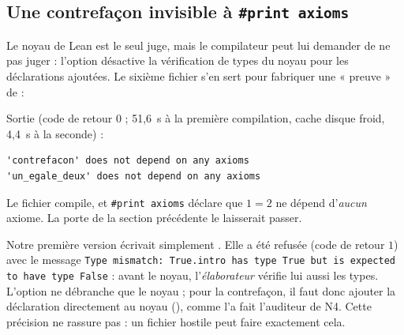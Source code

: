 \subsection{Une contrefaçon invisible à \texttt{\#print axioms}}
Le noyau de Lean est le seul juge, mais le compilateur peut lui demander de ne pas juger : l'option
 désactive la vérification de types du noyau pour les déclarations ajoutées. Le sixième
fichier s'en sert pour fabriquer une « preuve » de  :

\noindent Sortie (code de retour $0$ ; 51,6~s à la première compilation, cache disque froid, 4,4~s à la seconde) :
\begin{lstlisting}[style=appC,language={}]
'contrefacon' does not depend on any axioms
'un_egale_deux' does not depend on any axioms
\end{lstlisting}
Le fichier compile, et \texttt{\#print axioms} déclare que $1=2$ ne dépend d'\emph{aucun} axiome. La porte de la
section précédente le laisserait passer.

\begin{remark}
Notre première version écrivait simplement . Elle a été refusée (code de retour $1$) avec le message \texttt{Type mismatch: True.intro has type True
but is expected to have type False} : avant le noyau, l'\emph{élaborateur} vérifie lui aussi les types. L'option ne
débranche que le noyau ; pour la contrefaçon, il faut donc ajouter la déclaration directement au noyau
(), comme l'a fait l'auditeur de N4. Cette précision ne rassure pas : un fichier hostile peut faire
exactement cela.
\end{remark}

